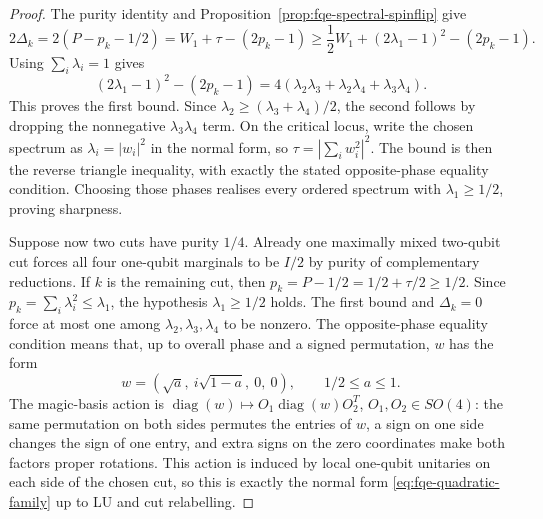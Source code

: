 \begin{proof}
The purity identity and Proposition~\ref{prop:fqe-spectral-spinflip} give
\[
2\Delta_k
=2(P-p_k-1/2)
=W_1+\tau-(2p_k-1)
\ge\frac12W_1+(2\lambda_1-1)^2-(2p_k-1).
\]
Using $\sum_i\lambda_i=1$ gives
\[
(2\lambda_1-1)^2-(2p_k-1)
=4(\lambda_2\lambda_3+\lambda_2\lambda_4+
\lambda_3\lambda_4).
\]
This proves the first bound. Since
$\lambda_2\ge(\lambda_3+\lambda_4)/2$,
the second follows by dropping the nonnegative
$\lambda_3\lambda_4$ term.
On the critical locus, write the chosen spectrum as $\lambda_i=|w_i|^2$
in the normal form, so $\tau=|\sum_iw_i^2|^2$.
The bound is then the reverse triangle inequality, with exactly the stated
opposite-phase equality condition. Choosing those phases realises every
ordered spectrum with $\lambda_1\ge1/2$, proving sharpness.

Suppose now two cuts have purity $1/4$. Already one
maximally mixed two-qubit cut forces all four one-qubit
marginals to be $I/2$ by purity of complementary
reductions. If $k$ is the remaining cut, then
$p_k=P-1/2=1/2+\tau/2\ge1/2$. Since
$p_k=\sum_i\lambda_i^2\le\lambda_1$, the hypothesis
$\lambda_1\ge1/2$ holds. The first bound and
$\Delta_k=0$ force at most one among
$\lambda_2,\lambda_3,\lambda_4$ to be nonzero.
The opposite-phase equality condition means that, up to
overall phase and a signed permutation, $w$ has the form
\[
w=(\sqrt a,\ i\sqrt{1-a},\ 0,\ 0),\qquad 1/2\le a\le1.
\]
The magic-basis action is
$\operatorname{diag}(w)\mapsto O_1\operatorname{diag}(w)O_2^T$, $O_1,O_2\in SO(4)$: the same permutation on both
sides permutes the entries of $w$, a sign on one side changes the sign of one entry, and extra signs on the zero
coordinates make both factors proper rotations. This action is induced by local one-qubit unitaries on
each side of the chosen cut, so this is exactly the
normal form \eqref{eq:fqe-quadratic-family} up to LU and
cut relabelling.
\end{proof}

